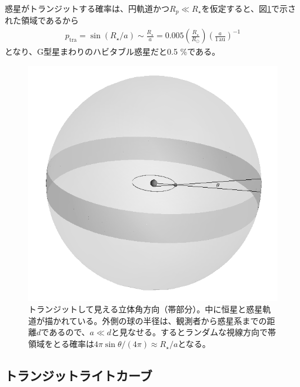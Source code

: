 惑星がトランジットする確率は、円軌道かつ$R_p \ll R_\star$を仮定すると、図\ref{fig:transitprob}で示された領域であるから
\begin{align}
p_\mathrm{tra} = \sin{(R_\star/a)} \sim \frac{R_\star}{a} = 0.005 \left(\frac{R_\star}{R_\odot}\right) \left(\frac{a}{1 \mathrm{\, au}}\right)^{-1}
\label{eq:tranp}
\end{align}
となり、G型星まわりのハビタブル惑星だと0.5 \%である。


\begin{figure}[!hbt]
 \begin{center}
	\includegraphics[width=\linewidth]{fig/transit_prob_bw.png}
\end{center}
	\caption{トランジットして見える立体角方向（帯部分）。中に恒星と惑星軌道が描かれている。外側の球の半径は、観測者から惑星系までの距離$d$であるので、$a \ll d$と見なせる。するとランダムな視線方向で帯領域をとる確率は$4 \pi \sin{\theta}/ (4 \pi) \approx R_\star/a$となる。\label{fig:transitprob}}
\end{figure} 

\subsection*{トランジットライトカーブ}

